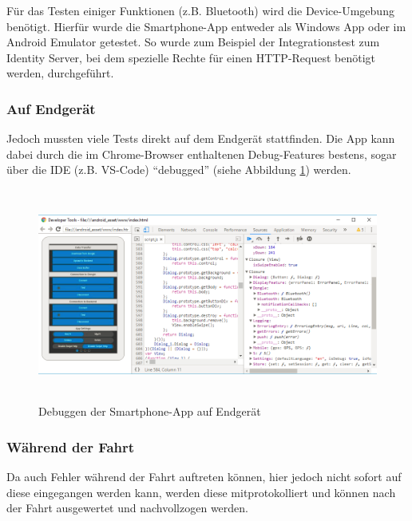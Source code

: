 Für das Testen einiger Funktionen (z.B. Bluetooth) wird die Device-Umgebung benötigt. Hierfür wurde die Smartphone-App entweder als Windows App oder im Android Emulator getestet. So wurde zum Beispiel der Integrationstest zum Identity Server, bei dem spezielle Rechte für einen HTTP-Request benötigt werden, durchgeführt.

\subsubsection{Auf Endgerät}

Jedoch mussten viele Tests direkt auf dem Endgerät stattfinden. Die App kann dabei durch die im Chrome-Browser enthaltenen Debug-Features bestens, sogar über die IDE (z.B. VS-Code) \enquote{debugged} (siehe Abbildung \ref{fig:App_Debug_Device}) werden.

\begin{figure}[H]
  \begin{center}
    \includegraphics[height=7cm,keepaspectratio]{./img/App_Debug_Device}
    \caption{Debuggen der Smartphone-App auf Endgerät}
    \label{fig:App_Debug_Device}
  \end{center}
\end{figure}

\subsubsection{Während der Fahrt}

Da auch Fehler während der Fahrt auftreten können, hier jedoch nicht sofort auf diese eingegangen werden kann, werden diese mitprotokolliert und können nach der Fahrt ausgewertet und nachvollzogen werden. 

 
 
 
 
 
 